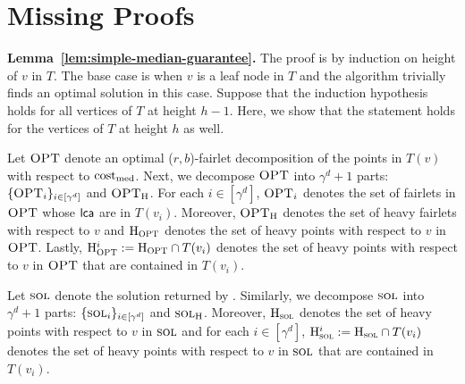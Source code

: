 \section{Missing Proofs}\label{sec:missing_proof}
\begin{proofof}{\bf Lemma~\ref{lem:simple-median-guarantee}.}
The proof is by induction on height of $v$ in $T$. The base case is when $v$ is a leaf node in $T$ and the algorithm trivially finds an optimal solution in this case. Suppose that the induction hypothesis holds for all vertices of $T$ at height $h-1$. Here, we show that the statement holds for the vertices of $T$ at height $h$ as well. 


Let $\textsc{OPT}$ denote an optimal ($r,b$)-fairlet decomposition of the points in $T(v)$ with respect to $\mathrm{cost}_{\mathrm{med}}$. 
Next, we decompose $\textsc{OPT}$ into $\gamma^d + 1$ parts: $\{\textsc{OPT}_i\}_{i\in [\gamma^d]}$ and $\textsc{OPT}_{\mathrm{H}}$. 
For each $i\in[\gamma^d]$, $\textsc{OPT}_i$ denotes the set of fairlets in $\textsc{OPT}$ whose $\textsf{lca}$ are in $T(v_i)$. Moreover, $\textsc{OPT}_{\mathrm{H}}$ denotes the set of heavy fairlets with respect to $v$ and $\mathrm{H}_{\textsc{OPT}}$ denotes the set of heavy points with respect to $v$ in $\textsc{OPT}$. Lastly, $\mathrm{H}^i_{\textsc{OPT}} := \mathrm{H}_{\textsc{OPT}} \cap T(v_i)$ denotes the set of heavy points with respect to $v$ in $\textsc{OPT}$ that are contained in $T(v_i)$. 
 
Let $\textsc{sol}$ denote the solution returned by . Similarly, we decompose $\textsc{sol}$ into $\gamma^d+1$ parts:  $\{\textsc{sol}_i\}_{i\in [\gamma^d]}$ and $\textsc{sol}_{\mathrm{H}}$. Moreover, $\mathrm{H}_{\textsc{sol}}$ denotes the set of heavy points with respect to $v$ in $\textsc{sol}$ and for each $i\in [\gamma^d]$, $\mathrm{H}^i_{\textsc{sol}} := \mathrm{H}_{\textsc{sol}} \cap T(v_i)$ denotes the set of heavy points with respect to $v$ in $\textsc{sol}$ that are contained in $T(v_i)$.


\end{proofof}
